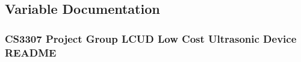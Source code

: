\subsection{Variable Documentation}
\subsubsection[{\texorpdfstring{R\+E\+A\+D\+ME}{README}}]{\setlength{\rightskip}{0pt plus 5cm}C\+S3307 Project Group L\+C\+UD Low Cost Ultrasonic Device R\+E\+A\+D\+ME}\hypertarget{README_8txt_a0c535680490f2918743714237e1bbd35}{}\label{README_8txt_a0c535680490f2918743714237e1bbd35}
